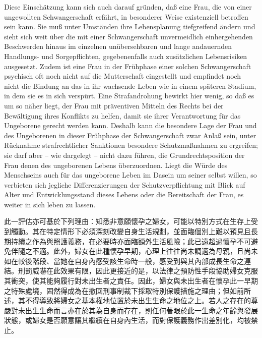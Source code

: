 \documentclass[12pt]{article}
\begin{document}
\begin{sourcepara}[title={原文D.76}]
Diese Einschätzung kann sich auch darauf gründen, daß eine Frau, die von einer ungewollten Schwangerschaft erfährt, in besonderer Weise existenziell betroffen sein kann. Sie muß unter Umständen ihre Lebensplanung tiefgreifend ändern und sieht sich weit über die mit einer Schwangerschaft unvermeidlich einhergehenden Beschwerden hinaus im einzelnen unübersehbaren und lange andauernden Handlungs- und Sorgepflichten, gegebenenfalls auch zusätzlichen Lebensrisiken ausgesetzt. Zudem ist eine Frau in der Frühphase einer solchen Schwangerschaft psychisch oft noch nicht auf die Mutterschaft eingestellt und empfindet noch nicht die Bindung an das in ihr wachsende Leben wie in einem späteren Stadium, in dem sie es in sich verspürt. Eine Strafandrohung bewirkt hier wenig, so daß es um so näher liegt, der Frau mit präventiven Mitteln des Rechts bei der Bewältigung ihres Konflikts zu helfen, damit sie ihrer Verantwortung für das Ungeborene gerecht werden kann. Deshalb kann die besondere Lage der Frau und des Ungeborenen in dieser Frühphase der Schwangerschaft zwar Anlaß sein, unter Rücknahme strafrechtlicher Sanktionen besondere Schutzmaßnahmen zu ergreifen; sie darf aber -- wie dargelegt -- nicht dazu führen, die Grundrechtsposition der Frau denen des ungeborenen Lebens überzuordnen. Liegt die Würde des Menschseins auch für das ungeborene Leben im Dasein um seiner selbst willen, so verbieten sich jegliche Differenzierungen der Schutzverpflichtung mit Blick auf Alter und Entwicklungsstand dieses Lebens oder die Bereitschaft der Frau, es weiter in sich leben zu lassen.
\end{sourcepara}
\begin{transpara}
此一評估亦可基於下列理由：知悉非意願懷孕之婦女，可能以特別方式在生存上受到觸動。其在特定情形下必須深刻改變自身生活規劃，並面臨個別上難以預見且長期持續之作為與照護義務，在必要時亦面臨額外生活風險；此已遠超過懷孕不可避免伴隨之不適。此外，婦女在此種懷孕早期，心理上往往尚未調適為母親，且尚未如在較後階段、當她在自身內感受該生命時一般，感受到與其內部成長生命之連結。刑罰威嚇在此效果有限，因此更接近的是，以法律之預防性手段協助婦女克服其衝突，使其能夠履行對未出生者之責任。因此，婦女與未出生者在懷孕此一早期之特殊處境，固然得成為在撤回刑事制裁下採取特別保護措施之理由；但如前所述，其不得導致將婦女之基本權地位置於未出生生命之地位之上。若人之存在的尊嚴對未出生生命而言亦在於其為自身而存在，則任何著眼於此一生命之年齡與發展狀態，或婦女是否願意讓其繼續在自身內生活，而對保護義務作出差別化，均被禁止。
\end{transpara}
\end{document}
